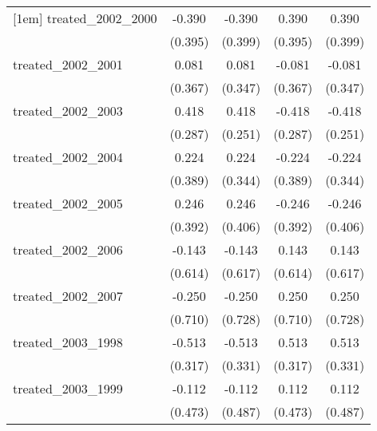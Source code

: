 {\begin{tabular}{l*{4}{c}}
[1em]
treated\_2002\_2000&      -0.390         &      -0.390         &       0.390         &       0.390         \\
            &     (0.395)         &     (0.399)         &     (0.395)         &     (0.399)         \\
[1em]
treated\_2002\_2001&       0.081         &       0.081         &      -0.081         &      -0.081         \\
            &     (0.367)         &     (0.347)         &     (0.367)         &     (0.347)         \\
[1em]
treated\_2002\_2003&       0.418         &       0.418         &      -0.418         &      -0.418         \\
            &     (0.287)         &     (0.251)         &     (0.287)         &     (0.251)         \\
[1em]
treated\_2002\_2004&       0.224         &       0.224         &      -0.224         &      -0.224         \\
            &     (0.389)         &     (0.344)         &     (0.389)         &     (0.344)         \\
[1em]
treated\_2002\_2005&       0.246         &       0.246         &      -0.246         &      -0.246         \\
            &     (0.392)         &     (0.406)         &     (0.392)         &     (0.406)         \\
[1em]
treated\_2002\_2006&      -0.143         &      -0.143         &       0.143         &       0.143         \\
            &     (0.614)         &     (0.617)         &     (0.614)         &     (0.617)         \\
[1em]
treated\_2002\_2007&      -0.250         &      -0.250         &       0.250         &       0.250         \\
            &     (0.710)         &     (0.728)         &     (0.710)         &     (0.728)         \\
[1em]
treated\_2003\_1998&      -0.513         &      -0.513         &       0.513         &       0.513         \\
            &     (0.317)         &     (0.331)         &     (0.317)         &     (0.331)         \\
[1em]
treated\_2003\_1999&      -0.112         &      -0.112         &       0.112         &       0.112         \\
            &     (0.473)         &     (0.487)         &     (0.473)         &     (0.487)         \\

\end{tabular}}

